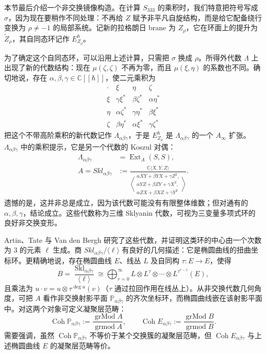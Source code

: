 本节最后介绍一个非交换镜像构造。在计算 $S_{333}$ 的乘积时，我们特意把符号写成 $\sigma$，因为现在要稍作不同处理：不再给 $Z$ 赋予非平凡自旋结构，而是给它配备绕行变换为 $\rho\ne-1$ 的局部系统。记新的拉格朗日 brane 为 $Z_\rho$，它在环面上的提升为 $\widetilde Z_\rho$，其自同态环记作 $E^\hbar_{Z_\rho}$。

为了确定这个自同态环，可以沿用上述计算，只需把 $\sigma$ 换成 $\rho$。所得外代数 $\Lambda$ 上出现了新的代数结构：现在 $\mu(\zeta,\zeta)$ 不再为零，而且 $\mu(\xi,\eta)$ 的系数也不同。确切地说，存在 $\alpha,\beta,\gamma\in\mathbb C[[\hbar]]$，使二元乘积为
\[
\begin{array}{c|ccc}
  \cdot & \xi & \eta & \zeta\\\hline
  \xi & \gamma\xi^* & \beta\zeta^* & \alpha\eta^*\\
  \eta & \alpha\zeta^* & \gamma\eta^* & \beta\xi^*\\
  \zeta & \beta\eta^* & \alpha\xi^* & \gamma\zeta^*
\end{array}
\]
把这个不带高阶乘积的新代数记作 $\Lambda_{\alpha\beta\gamma}$，于是 $E^\hbar_{Z_\rho}$ 是 $\Lambda_{\alpha\beta\gamma}$ 的一个 $A_\infty$ 扩张。$\Lambda_{\alpha\beta\gamma}$ 中的乘积提示，它是另一个代数的 Koszul 对偶：
\[
\begin{aligned}
  \Lambda_{\alpha\beta\gamma}&=\operatorname{Ext}_A(S,S),\\
  A=Skl_{\alpha\beta\gamma}&:=
  \frac{\mathbb C\langle X,Y,Z\rangle}
  {\left\langle\begin{gathered}
    \alpha XY+\beta YX+\gamma Z^2,\\
    \alpha YZ+\beta ZY+\gamma X^2,\\
    \alpha ZX+\beta XZ+\gamma Y^2
  \end{gathered}\right\rangle}.
\end{aligned}
\]
遗憾的是，这并非总是成立，因为该代数可能没有有限整体维数；但对通有的 $\alpha,\beta,\gamma$，结论成立。这些代数称为三维 Sklyanin 代数，可视为三变量多项式环的良好非交换变形。

Artin、Tate 与 Van den Bergh 研究了这些代数，并证明这类环的中心由一个次数为 $3$ 的元素 $\ell$ 生成。商 $Skl_{\alpha\beta\gamma}/\langle\ell\rangle$ 有良好的几何描述：它是椭圆曲线的扭曲坐标环。更精确地说，存在椭圆曲线 $E$、线丛 $L$ 及自同构 $\tau:E\to E$，使得
\[
  B=\frac{\operatorname{Skl}_{\alpha\beta\gamma}}{\langle\ell\rangle}
  \cong\bigoplus_{r=0}^{\infty}
  L\otimes L^\tau\otimes\cdots\otimes L^{\tau^{r-1}}(E),
\]
且乘法为 $u\cdot v=u\otimes\tau^{\deg u}(v)$（$\tau$ 通过拉回作用在线丛上）。从非交换代数几何角度，可把 $A$ 看作非交换射影平面 $\mathbb P_{\alpha\beta\gamma}$ 的齐次坐标环，而椭圆曲线嵌在该射影平面中。对这两个对象可定义凝聚层范畴：
\[
  \operatorname{Coh}\mathbb P_{\alpha\beta\gamma}
  :=\frac{\operatorname{grMod}A}{\operatorname{grmod}A},\qquad
  \operatorname{Coh}E_{\alpha\beta\gamma}
  :=\frac{\operatorname{grMod}B}{\operatorname{grmod}B}.
\]
需要强调，虽然 $\operatorname{Coh}\mathbb P_{\alpha\beta\gamma}$ 不等价于某个交换簇的凝聚层范畴，但 $\operatorname{Coh}E_{\alpha\beta\gamma}$ 与上述椭圆曲线 $E$ 的凝聚层范畴等价。

